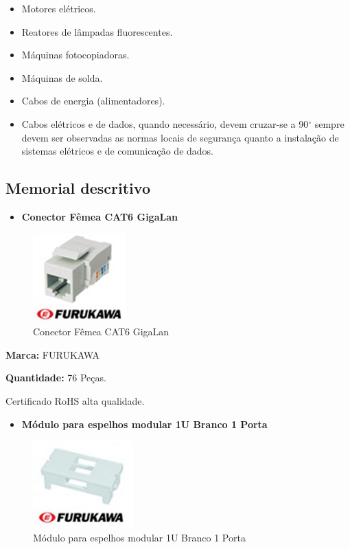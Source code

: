 \documentclass[	DIV=calc,%
paper=a4,%
fontsize=12pt,%
onecolumn]{scrartcl}	 					%
\begin{document}
	\begin{itemize}	
		\item Motores elétricos. 
		\item Reatores de lâmpadas fluorescentes.
		\item Máquinas fotocopiadoras.
		\item Máquinas de solda.
		\item Cabos de energia (alimentadores). 
		\item Cabos elétricos e de dados, quando necessário, devem cruzar-se a 90$^\circ$ sempre devem ser observadas as normas locais de segurança quanto a instalação de sistemas elétricos e de comunicação de dados.
	\end{itemize}
	
	
	\subsection{Memorial descritivo}
	
	\begin{itemize}
		\item \textbf{Conector Fêmea CAT6 GigaLan} 
	\end{itemize}
	
	\begin{figure}
		\centering
		\caption{Conector Fêmea CAT6 GigaLan}
		\includegraphics{keystone1}
	\end{figure}
	
	\textbf{Marca:} FURUKAWA 
	
	\textbf{Quantidade:} 76 Peças.
	
	Certificado RoHS alta qualidade.
	
	\begin{itemize}
		\item \textbf{Módulo para espelhos modular 1U Branco 1 Porta} 
	\end{itemize}
	
	\begin{figure}
		\centering
		\caption{Módulo para espelhos modular 1U Branco 1 Porta}
		\includegraphics{espelho1}
	\end{figure}
	
\end{document}
